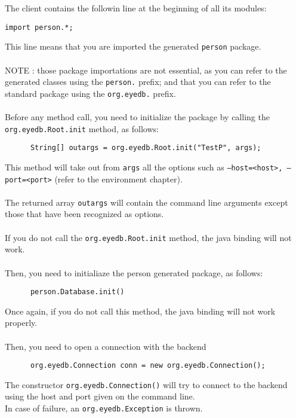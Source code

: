 The client contains the followin line at the beginning of all
its modules:
{\verbsize \begin{verbatim}
import person.*;
\end{verbatim}
}
This line means that you are imported the generated \texttt{person} package.
\\
\\
NOTE : those package importations are not essential, as you can refer to the
generated classes using the \texttt{person.} prefix; and that you can refer
to the standard \eyedb package using the \texttt{org.eyedb.} prefix.
\\
\\
Before any \eyedb method call, you need to initialize the \eyedb
package by calling the \texttt{org.eyedb.Root.init} method, as follows:
{\verbsize \begin{verbatim}
      String[] outargs = org.eyedb.Root.init("TestP", args);
\end{verbatim}
}
This method will take out from \texttt{args} all the \eyedb options
such as \texttt{--host=<host>, --port=<port>}
(refer to the environment chapter).
\\
\\
The returned array \texttt{outargs} will contain the command line arguments
except those that have been recognized as \eyedb options.
\\
\\
If you do not call the \texttt{org.eyedb.Root.init} method, the \eyedb java binding
will not work.
\\
\\
Then, you need to initialiaze the person generated package, as follows:
{\verbsize \begin{verbatim}
      person.Database.init()
\end{verbatim}
}
Once again, if you do not call this method, the \eyedb java binding will
not work properly.
\\
\\
Then, you need to open a connection with the \eyedb backend
{\verbsize \begin{verbatim}
      org.eyedb.Connection conn = new org.eyedb.Connection();
\end{verbatim}
}
The constructor \texttt{org.eyedb.Connection()} will try to connect to the backend
using the host and port given on the command line.
\\
In case of failure, an \texttt{org.eyedb.Exception} is thrown.
\\
\\
